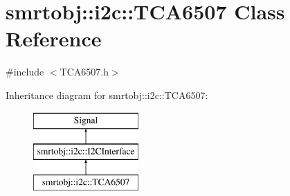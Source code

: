\hypertarget{classsmrtobj_1_1i2c_1_1_t_c_a6507}{}\section{smrtobj\+:\+:i2c\+:\+:T\+C\+A6507 Class Reference}
\label{classsmrtobj_1_1i2c_1_1_t_c_a6507}


{\ttfamily \#include $<$T\+C\+A6507.\+h$>$}

Inheritance diagram for smrtobj\+:\+:i2c\+:\+:T\+C\+A6507\+:\begin{figure}[H]
\begin{center}
\leavevmode
\includegraphics[height=3.000000cm]{classsmrtobj_1_1i2c_1_1_t_c_a6507}
\end{center}
\end{figure}
